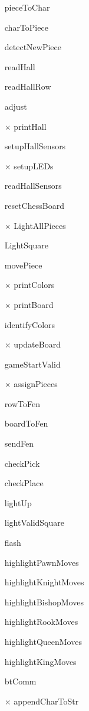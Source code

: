 \documentclass[12pt, titlepage]{article}
\begin{document}
\begin{itemize}
  \item[\checkmark] pieceToChar
  \item[\checkmark] charToPiece
  \item[\checkmark] detectNewPiece
  \item[\checkmark] readHall
  \item[\checkmark] readHallRow
  \item[\checkmark] adjust
  \item[$\times$] printHall
  \item[\checkmark] setupHallSensors
  \item[$\times$] setupLEDs
  \item[\checkmark] readHallSensors
  \item[\checkmark] resetChessBoard
  \item[$\times$] LightAllPieces
  \item[\checkmark] LightSquare
  \item[\checkmark] movePiece
  \item[$\times$] printColors
  \item[$\times$] printBoard
  \item[\checkmark] identifyColors
  \item[$\times$] updateBoard
  \item[\checkmark] gameStartValid
  \item[$\times$] assignPieces
  \item[\checkmark] rowToFen
  \item[\checkmark] boardToFen
  \item[\checkmark] sendFen
  \item[\checkmark] checkPick
  \item[\checkmark] checkPlace
  \item[\checkmark] lightUp
  \item[\checkmark] lightValidSquare
  \item[\checkmark] flash
  \item[\checkmark] highlightPawnMoves
  \item[\checkmark] highlightKnightMoves
  \item[\checkmark] highlightBishopMoves
  \item[\checkmark] highlightRookMoves
  \item[\checkmark] highlightQueenMoves
  \item[\checkmark] highlightKingMoves
  \item[\checkmark] btComm
  \item[$\times$] appendCharToStr

\end{itemize}
\end{document}
